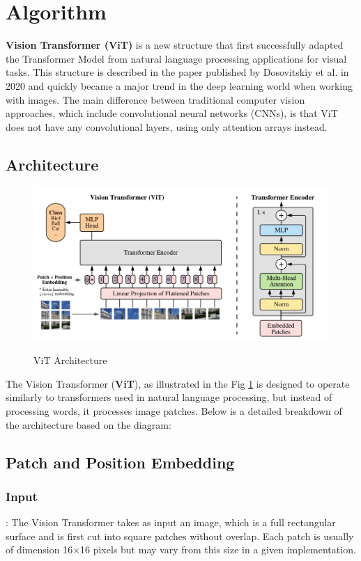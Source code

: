 \section{Algorithm}
\textbf{Vision Transformer (ViT)} is a new structure that first successfully adapted the Transformer Model from natural language processing applications for visual tasks. This structure is described in the paper published by Dosovitskiy et al. \cite{df01} in 2020 and quickly became a major trend in the deep learning world when working with images. The main difference between traditional computer vision approaches, which include convolutional neural networks (CNNs), is that ViT does not have any convolutional layers, using only attention arrays instead.

\subsection{Architecture}
\begin{figure}[h!]
  \centering
  \includegraphics[width=1\textwidth]{images/vit_figure.png}
  \caption{ViT Architecture}\cite{df01}
  \label{fig:vit_architecture}
\end{figure}
The Vision Transformer (\textbf{ViT}), as illustrated in the Fig \ref{fig:vit_architecture} is designed to operate similarly to transformers used in natural language processing, but instead of processing words, it processes image patches. Below is a detailed breakdown of the architecture based on the diagram:
\subsection{Patch and Position Embedding}
\subsubsection{Input}: The Vision Transformer takes as input an image, which is a full rectangular surface and is first cut into square patches without overlap. Each patch is usually of dimension 16×16 pixels but may vary from this size in a given implementation.
